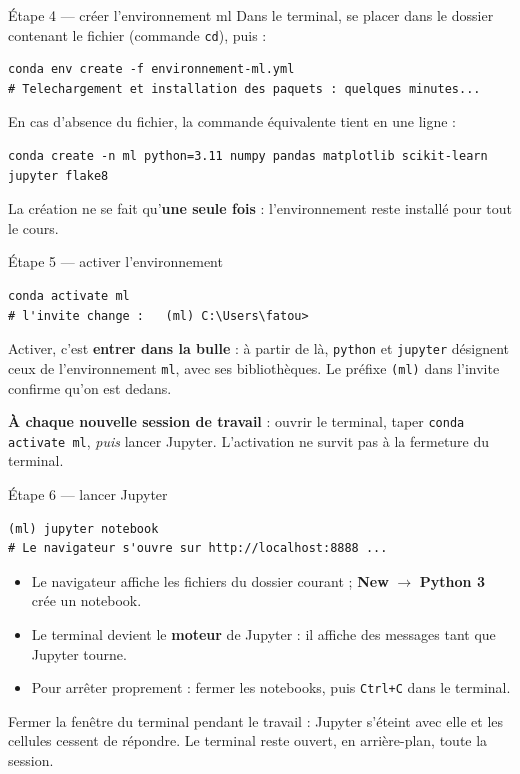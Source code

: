 \documentclass[aspectratio=169,11pt]{beamer}
\begin{document}
\begin{frame}[fragile]{Étape 4 — créer l'environnement ml}
{\small Dans le terminal, se placer dans le dossier contenant le fichier (commande \texttt{cd}), puis :}
\begin{lstlisting}[style=sh]
conda env create -f environnement-ml.yml
# Telechargement et installation des paquets : quelques minutes...
\end{lstlisting}
{\small En cas d'absence du fichier, la commande équivalente tient en une ligne :}
\begin{lstlisting}[style=sh]
conda create -n ml python=3.11 numpy pandas matplotlib scikit-learn jupyter flake8
\end{lstlisting}
{\small La création ne se fait qu'\textbf{une seule fois} : l'environnement reste installé pour tout le cours.}
\end{frame}

\begin{frame}[fragile]{Étape 5 — activer l'environnement}
\begin{lstlisting}[style=sh]
conda activate ml
# l'invite change :   (ml) C:\Users\fatou>
\end{lstlisting}
\begin{ucaddef}
{\small Activer, c'est \textbf{entrer dans la bulle} : à partir de là, \texttt{python} et \texttt{jupyter} désignent ceux de l'environnement \texttt{ml}, avec ses bibliothèques. Le préfixe \texttt{(ml)} dans l'invite confirme qu'on est dedans.}
\end{ucaddef}
\begin{ucadret}
{\small \textbf{À chaque nouvelle session de travail} : ouvrir le terminal, taper \texttt{conda activate ml}, \emph{puis} lancer Jupyter. L'activation ne survit pas à la fermeture du terminal.}
\end{ucadret}
\end{frame}

\begin{frame}[fragile]{Étape 6 — lancer Jupyter}
\begin{lstlisting}[style=sh]
(ml) jupyter notebook
# Le navigateur s'ouvre sur http://localhost:8888 ...
\end{lstlisting}
\begin{itemize}\small
  \item Le navigateur affiche les fichiers du dossier courant ; \textbf{New} $\to$ \textbf{Python 3} crée un notebook.
  \item Le terminal devient le \textbf{moteur} de Jupyter : il affiche des messages tant que Jupyter tourne.
  \item Pour arrêter proprement : fermer les notebooks, puis \texttt{Ctrl+C} dans le terminal.
\end{itemize}
\begin{ucadpiege}
{\small Fermer la fenêtre du terminal pendant le travail : Jupyter s'éteint avec elle et les cellules cessent de répondre. Le terminal reste ouvert, en arrière-plan, toute la session.}
\end{ucadpiege}
\end{frame}
\end{document}
